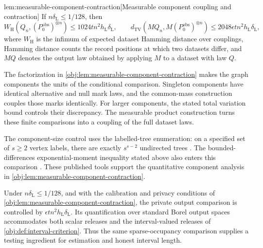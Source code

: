 \begin{lemmav}{lem:measurable-component-contraction}[Measurable component coupling and contraction]
If \(n\delta_{\mathrm L}\le1/128\), then
\[
W_{\mathrm H}\!\left(Q_n,(P_0^{\mathrm{obs}})^{\otimes n}\right)
 \le1024tn^2h_{\mathrm L}\delta_{\mathrm L},
\qquad
d_{\mathrm{TV}}\!\left(MQ_n,M(P_0^{\mathrm{obs}})^{\otimes n}\right)
 \le2048\epsilon tn^2h_{\mathrm L}\delta_{\mathrm L},
\]
where \(W_{\mathrm H}\) is the infimum of expected dataset Hamming distance over couplings, Hamming distance counts the record positions at which two datasets differ, and \(MQ\) denotes the output law obtained by applying \(M\) to a dataset with law \(Q\).
\end{lemmav}

The factorization in \cref{obj:lem:measurable-component-contraction} makes the graph components the units of the conditional comparison. Singleton components have identical alternative and null mark laws, and the common-mass construction couples those marks identically. For larger components, the stated total variation bound controls their discrepancy. The measurable product construction turns these finite comparisons into a coupling of the full dataset laws.

The component-size control uses the labelled-tree enumeration: on a specified set of \(s\ge2\) vertex labels, there are exactly \(s^{s-2}\) undirected trees \citep[Section 5.6, Theorem 5.40]{KellerTrotterAppliedCombinatorics}. The bounded-differences exponential-moment inequality stated above also enters this comparison \citep[Theorem 6.2, displayed log-mgf conclusion in its proof, p.~167]{BoucheronLugosiMassart2013}. These published tools support the quantitative component analysis in \cref{obj:lem:measurable-component-contraction}.

Under \(n\delta_{\mathrm L}\le1/128\), and with the calibration and privacy conditions of \cref{obj:lem:measurable-component-contraction}, the private output comparison is controlled by \(\epsilon tn^2h_{\mathrm L}\delta_{\mathrm L}\). Its quantification over standard Borel output spaces accommodates both scalar releases and the interval-valued releases of \cref{obj:def:interval-criterion}. Thus the same sparse-occupancy comparison supplies a testing ingredient for estimation and honest interval length.

